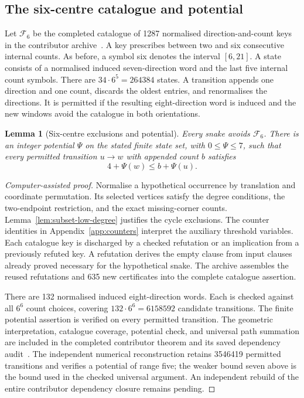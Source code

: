 \documentclass[11pt,a4paper]{article}
\newtheorem{lemma}[theorem]{Lemma}
\theoremstyle{definition}
\theoremstyle{remark}
\begin{document}
\subsection{The six-centre catalogue and potential}\label{sec:six-centre-235}
Let $\mathcal F_6$ be the completed catalogue of 1287 normalised direction-and-count keys in the contributor archive~\cite{bound235archive}. A key prescribes between two and six consecutive internal counts. As before, a symbol six denotes the interval $[6,21]$. A state consists of a normalised induced seven-direction word and the last five internal count symbols. There are $34\cdot6^5=264384$ states. A transition appends one direction and one count, discards the oldest entries, and renormalises the directions. It is permitted if the resulting eight-direction word is induced and the new windows avoid the catalogue in both orientations.

\begin{lemma}[Six-centre exclusions and potential]\label{lem:six-centre-235}
Every snake avoids $\mathcal F_6$. There is an integer potential $\Psi$ on the stated finite state set, with $0\le\Psi\le7$, such that every permitted transition $u\to w$ with appended count $b$ satisfies
\begin{equation}\label{eq:six-centre-step}
4+\Psi(w)\le b+\Psi(u).
\end{equation}
\end{lemma}
\begin{proof}[Computer-assisted proof]
Normalise a hypothetical occurrence by translation and coordinate permutation. Its selected vertices satisfy the degree conditions, the two-endpoint restriction, and the exact missing-corner counts. Lemma~\ref{lem:subset-low-degree} justifies the cycle exclusions. The counter identities in Appendix~\ref{app:counters} interpret the auxiliary threshold variables. Each catalogue key is discharged by a checked refutation or an implication from a previously refuted key. A refutation derives the empty clause from input clauses already proved necessary for the hypothetical snake. The archive assembles the reused refutations and 635 new certificates into the complete catalogue assertion.

There are 132 normalised induced eight-direction words. Each is checked against all $6^6$ count choices, covering $132\cdot6^6=6158592$ candidate transitions. The finite potential assertion is verified on every permitted transition. The geometric interpretation, catalogue coverage, potential check, and universal path summation are included in the completed contributor theorem and its saved dependency audit~\cite{bound235archive}. The independent numerical reconstruction retains 3546419 permitted transitions and verifies a potential of range five; the weaker bound seven above is the bound used in the checked universal argument. An independent rebuild of the entire contributor dependency closure remains pending.
\end{proof}
\end{document}
